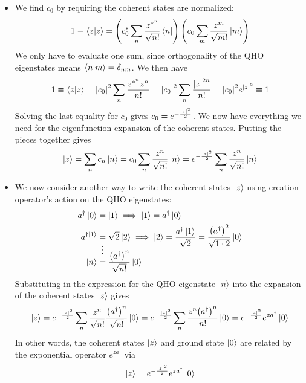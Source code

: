 \documentclass[11pt, a4paper]{article}
\begin{document}
\begin{itemize}
	\item We find $ c_{0} $ by requiring the coherent states are normalized:
	\begin{equation*}
		1 \equiv \braket{z}{z} = \left(c_{0}^{*} \sum_{n} \frac{z^{*^{n}}}{\sqrt{n!}}\bra{n}\right)\left(c_{0} \sum_{m} \frac{z^{m}}{\sqrt{m!}}\ket{m}\right)
	\end{equation*}
	We only have to evaluate one sum, since orthogonality of the QHO eigenstates means $ \braket{n}{m} = \delta_{nm} $. We then have
	\begin{equation*}
		1 \equiv \braket{z}{z} = \abs{c_{0}}^{2} \sum_{n}\frac{z^{*^{n}}z^{n}}{n!} = \abs{c_{0}}^{2}\sum_{n}\frac{\abs{z}^{2n}}{n!} = \abs{c_{0}}^{2}e^{\abs{z}^{2}} \equiv 1
	\end{equation*}
	Solving the last equality for $ c_{0} $  gives $ c_{0} = e^{-\frac{\abs{z}^{2}}{2}} $. We now have everything we need for the eigenfunction expansion of the coherent states. Putting the pieces together gives
	\begin{equation*}
		\ket{z} =  \sum_{n}c_{n} \ket{n} = c_{0} \sum_{n} \frac{z^{n}}{\sqrt{n!}}\ket{n} = e^{-\frac{\abs{z}^{2}}{2}} \sum_{n}\frac{z^{n}}{\sqrt{n!}} \ket{n}
	\end{equation*}
	
	\item We now consider another way to write the coherent states $ \ket{z} $ using creation operator's action on the QHO eigenstates:
	\begin{align*}
		a^{\dagger} \ket{0} &= \ket{1} \implies \ket{1} = a^{\dagger}\ket{0}\\
		a^{\dagger \ket{1}} &= \sqrt{2}\ket{2} \implies \ket{2} = \frac{a^{\dagger}\ket{1}}{\sqrt{2}} = \frac{\big(a^{\dagger}\big)^{2}}{\sqrt{1 \cdot 2}} \ket{0}\\[-4mm]
		&\ \, \vdots \\[-4mm]
		\ket{n} &= \frac{\big(a^{\dagger}\big)^{n}}{\sqrt{n!}} \ket{0}
	\end{align*} 
	Substituting in the expression for the QHO eigenstate $ \ket{n} $ into the expansion of the coherent states $ \ket{z} $ gives
	\begin{equation*}
		\ket{z} = e^{-\frac{\abs{z}^{2}}{2}} \sum_{n}\frac{z^{n}}{\sqrt{n!}} \frac{\big(a^{\dagger}\big)^{n}}{\sqrt{n!}} \ket{0} = e^{-\frac{\abs{z}^{2}}{2}} \sum_{n} \frac{z^{n}\big(a^{\dagger}\big)^{n}}{n!} \ket{0} =  e^{-\frac{\abs{z}^{2}}{2}}  e^{za^{\dagger}} \ket{0}
	\end{equation*}
	In other words, the coherent states $ \ket{z} $ and ground state $ \ket{0} $ are related by the exponential operator $ e^{za^{\dagger}} $ via
	\begin{equation*}
		\ket{z} =  e^{-\frac{\abs{z}^{2}}{2}}  e^{za^{\dagger}} \ket{0}
	\end{equation*}
	

\end{itemize}
\end{document}
